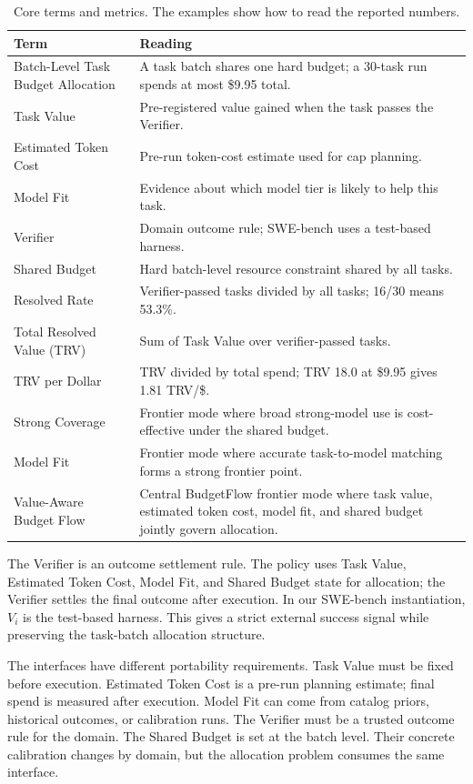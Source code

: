 \documentclass[sigconf,review,anonymous]{acmart}
\newcommand{\method}{BudgetFlow\xspace}
\newcommand{\trv}{TRV\xspace}
\newcommand{\taskvalue}{Task Value\xspace}
\newcommand{\tokencost}{Estimated Token Cost\xspace}
\newcommand{\modelfit}{Model Fit\xspace}
\newcommand{\sharedbudget}{Shared Budget\xspace}
\newcommand{\verifier}{Verifier\xspace}
\begin{document}
\begin{table}[t]
\centering
\footnotesize
\begin{tabular}{@{}p{}p{}@{}}
\toprule
Term & Reading \\
\midrule
Batch-Level Task Budget Allocation & A task batch shares one hard budget; a 30-task run spends at most \$9.95 total. \\
\taskvalue & Pre-registered value gained when the task passes the \verifier. \\
\tokencost & Pre-run token-cost estimate used for cap planning. \\
\modelfit & Evidence about which model tier is likely to help this task. \\
\verifier & Domain outcome rule; SWE-bench uses a test-based harness. \\
\sharedbudget & Hard batch-level resource constraint shared by all tasks. \\
Resolved Rate & Verifier-passed tasks divided by all tasks; 16/30 means 53.3\%. \\
Total Resolved Value (\trv) & Sum of \taskvalue over verifier-passed tasks. \\
\trv per Dollar & \trv divided by total spend; \trv 18.0 at \$9.95 gives 1.81 \trv/\$. \\
Strong Coverage & Frontier mode where broad strong-model use is cost-effective under the shared budget. \\
Model Fit & Frontier mode where accurate task-to-model matching forms a strong frontier point. \\
Value-Aware Budget Flow & Central \method frontier mode where task value, estimated token cost, model fit, and shared budget jointly govern allocation. \\
\bottomrule
\end{tabular}
\caption{Core terms and metrics. The examples show how to read the reported numbers.}
\label{tab:glossary}
\end{table}

The \verifier is an outcome settlement rule. The policy uses \taskvalue, \tokencost, \modelfit, and \sharedbudget state for allocation; the \verifier settles the final outcome after execution. In our SWE-bench instantiation, $V_i$ is the test-based harness. This gives a strict external success signal while preserving the task-batch allocation structure.

The interfaces have different portability requirements. \taskvalue must be fixed before execution. \tokencost is a pre-run planning estimate; final spend is measured after execution. \modelfit can come from catalog priors, historical outcomes, or calibration runs. The \verifier must be a trusted outcome rule for the domain. The \sharedbudget is set at the batch level. Their concrete calibration changes by domain, but the allocation problem consumes the same interface.
\end{document}
